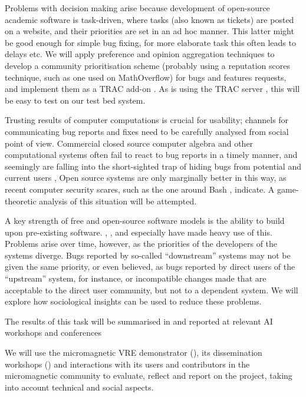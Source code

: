 \begin{workpackage}[id=social-aspects,wphases=0-48,
  title=Social Aspects,
  lead=UO,
  UORM=23,USHRM=18,USORM=6]
\begin{tasklist}
\begin{task}[title=Mechanism Design for free software development,PM=15,lead=UO,
id=isocial-decisionmaking]
Problems with decision making arise because 
development of open-source academic software is task-driven,
where tasks (also known as tickets) are posted on a website, and their
priorities are set in an ad hoc manner.  This latter might be
good enough for simple bug fixing, for more elaborate task this often
leads to delays etc.  
We will apply preference
and opinion aggregation techniques \cite{pref-aggr} to develop a
community prioritisation scheme (probably using a reputation scores
technique, such as one used on MathOverflow) for bugs and features requests,
and implement them as a TRAC \cite{Trac} add-on 
.
As \Sage is using the TRAC server \cite{trac-sagemath}, 
this will be easy to test on our test bed system.

 Trusting results of computer computations is crucial for
usability; channels for communicating bug reports and fixes need to be
carefully analysed from social point of view.  Commercial closed
source computer algebra and other computational systems often fail to
react to bug reports in a timely manner, and seemingly are falling
into the short-sighted trap of hiding bugs from potential and current
users \cite{misfort}, Open source systems are only marginally better
in this way, as recent computer security scares, such as the one
around Bash \cite{shellshock}, indicate.  A game-theoretic analysis of
this situation will be attempted.


A key strength of free and open-source software models is the ability
to build upon pre-existing software. \GAP, \PariGP, \Singular and
especially \Sage have made heavy use of this. Problems arise over
time, however, as the priorities of the developers of the systems
diverge. Bugs reported by so-called ``downstream'' systems may not be
given the same priority, or even believed, as bugs reported by direct
users of the ``upstream'' system, for instance, or incompatible
changes made that are acceptable to the direct user community, but not
to a dependent system. We will explore how sociological insights can
be used to reduce these problems.

The results of this task will be summarised in 
and reported at relevant AI workshops and conferences
\end{task}

\begin{task}[title=Evaluation of Micromagnetic VRE,lead=USO,PM=6,
id=oommf-nb-evaluation,partners={UO,PS}]
  We will use the micromagnetic VRE demonstrator
  (), its dissemination
  workshops \linebreak()
  and interactions with its users and contributors in the
  micromagnetic community to evaluate, reflect and report on the project,
  taking into account technical and social aspects.


\end{task}
\end{tasklist}
\end{workpackage}
